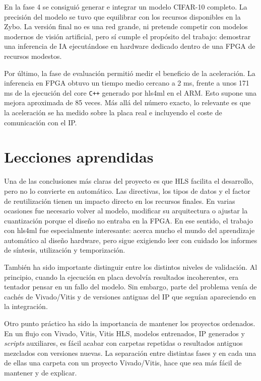 En la fase 4 se consiguió generar e integrar un modelo \ac{CIFAR}-10 completo. La
precisión del modelo
se tuvo que equilibrar con los recursos disponibles en la Zybo. La versión final no es una red
grande, ni pretende competir con modelos modernos de visión artificial, pero sí cumple el propósito
del trabajo: demostrar una inferencia de \ac{IA} ejecutándose en hardware dedicado dentro
de una \ac{FPGA} de
recursos modestos.

Por último, la fase de evaluación permitió medir el beneficio de la aceleración. La inferencia en
\ac{FPGA} obtuvo un tiempo medio cercano a 2 ms, frente a unos 171 ms de la ejecución del
core \texttt{C++}
generado por hls4ml en el \ac{ARM}. Esto supone una mejora aproximada de 85 veces. Más
allá del número
exacto, lo relevante es que la aceleración se ha medido sobre la placa real e incluyendo el coste de
comunicación con el \ac{IP}.

\section{Lecciones aprendidas}

Una de las conclusiones más claras del proyecto es que \ac{HLS} facilita el desarrollo, pero no lo
convierte en automático. Las directivas, los tipos de datos y el factor de reutilización tienen un
impacto directo en los recursos finales. En varias ocasiones fue necesario volver al modelo,
modificar su arquitectura o ajustar la cuantización porque el diseño no entraba en la
\ac{FPGA}. En ese
sentido, el trabajo con hls4ml fue especialmente interesante: acerca mucho el mundo del aprendizaje
automático al diseño hardware, pero sigue exigiendo leer con cuidado los informes de síntesis,
utilización y temporización.

También ha sido importante distinguir entre los distintos niveles de validación. Al principio,
cuando la ejecución en placa devolvía resultados incoherentes, era tentador pensar en un fallo del
modelo. Sin embargo, parte del problema venía de cachés de Vivado/Vitis y de versiones antiguas del
\ac{IP} que seguían apareciendo en la integración.

Otro punto práctico ha sido la importancia de mantener los proyectos ordenados. En un flujo con
Vivado, Vitis, Vitis \ac{HLS}, modelos entrenados, \ac{IP} generados y \textit{scripts}
auxiliares, es fácil acabar
con carpetas repetidas o resultados antiguos mezclados con versiones nuevas. La separación entre
distintas fases y en cada una de ellas una carpeta con un proyecto Vivado/Vitis, hace que sea más
fácil de mantener y de explicar.

